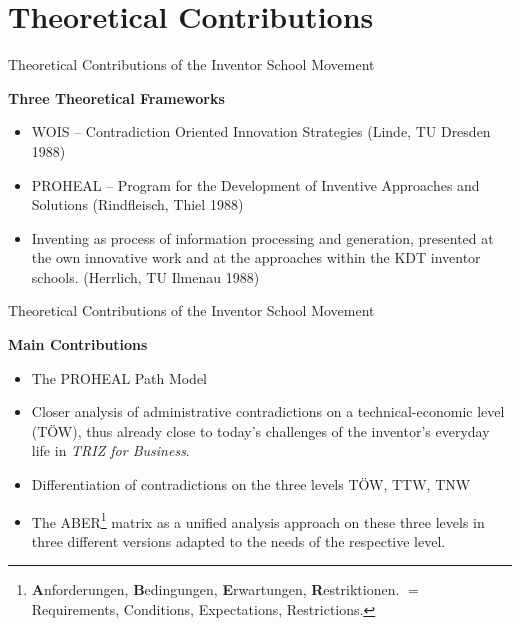 \documentclass[11pt]{beamer}
\begin{document}
\section{Theoretical Contributions}
\begin{frame}{Theoretical Contributions of the Inventor School Movement}

\textbf{Three Theoretical Frameworks}
\begin{itemize}
\item WOIS -- Contradiction Oriented Innovation Strategies (Linde, TU Dresden
  1988)
\item PROHEAL -- Program for the Development of Inventive Approaches and
  Solutions (Rindfleisch, Thiel 1988)
\item Inventing as process of information processing and generation, presented
  at the own innovative work and at the approaches within the KDT inventor
  schools. (Herrlich, TU Ilmenau 1988)
\end{itemize}
\end{frame}

\begin{frame}{Theoretical Contributions of the Inventor School Movement}

\textbf{Main Contributions}
\begin{itemize}
\item The PROHEAL Path Model
\item Closer analysis of administrative contradictions on a technical-economic
  level (TÖW), thus already close to today's challenges of the inventor's
  everyday life in \emph{TRIZ for Business}.
\item Differentiation of contradictions on the three levels TÖW, TTW, TNW
\item The ABER\footnote{\textbf{A}nforderungen, \textbf{B}edingungen,
  \textbf{E}rwartungen, \textbf{R}estriktionen. $=$ Requirements, Conditions,
  Expectations, Restrictions.} matrix as a unified analysis approach on these
  three levels in three different versions adapted to the needs of the
  respective level.
\end{itemize}
\end{frame}
\end{document}
